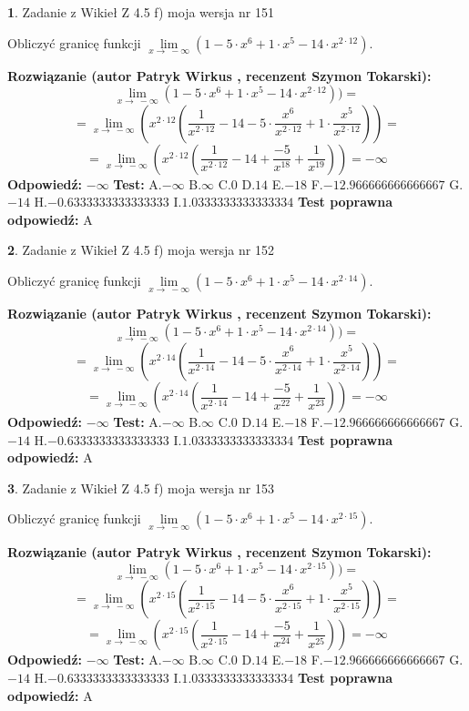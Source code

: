 \documentclass[12pt, a4paper]{article}
\theoremstyle{definition} %
\newtheorem{zad}{}
\newcommand{\zadStart}[1]{\begin{zad}#1\newline}
\newcommand{\zadStop}{\end{zad}}
\newcommand{\rozwStart}[2]{\noindent \textbf{Rozwiązanie (autor #1 , recenzent #2): }\newline}
\newcommand{\rozwStop}{\newline}
\newcommand{\odpStart}{\noindent \textbf{Odpowiedź:}\newline}
\newcommand{\odpStop}{\newline}
\newcommand{\testStart}{\noindent \textbf{Test:}\newline}
\newcommand{\testStop}{\newline}
\newcommand{\kluczStart}{\noindent \textbf{Test poprawna odpowiedź:}\newline}
\newcommand{\kluczStop}{\newline}
\begin{document}
\zadStart{Zadanie z Wikieł Z 4.5 f) moja wersja nr 151}


Obliczyć granicę funkcji  $\lim\limits_{x\to\ -\infty}(1 - 5 \cdot x^{6}+1 \cdot x^{5}- 14 \cdot x^{2\cdot12})$.
\zadStop
\rozwStart{Patryk Wirkus}{Szymon Tokarski}
$$\lim\limits_{x\to\ -\infty}(1 - 5 \cdot x^{6}+1 \cdot x^{5}- 14 \cdot x^{2\cdot12}))=$$
$$=\lim\limits_{x\to\ -\infty}(x^{2\cdot12}(\frac{1}{x^{2\cdot12}}-14 -5 \cdot \frac{x^{6}}{x^{2\cdot12}}+1 \cdot \frac{x^{5}}{x^{2\cdot12}}))=$$
$$=\lim\limits_{x\to\ -\infty}(x^{2\cdot12}(\frac{1}{x^{2\cdot12}}-14 + \frac{-5}{x^{18}}+ \frac{1}{x^{19}}))=-\infty$$
\rozwStop
\odpStart
$-\infty$
\odpStop
\testStart
A.$-\infty$ B.$\infty$ C.$0$ D.$14$ E.$-18$
F.$-12.966666666666667$ G.$-14$
H.$-0.6333333333333333$
I.$1.0333333333333334$
\testStop
\kluczStart
A
\kluczStop



\zadStart{Zadanie z Wikieł Z 4.5 f) moja wersja nr 152}


Obliczyć granicę funkcji  $\lim\limits_{x\to\ -\infty}(1 - 5 \cdot x^{6}+1 \cdot x^{5}- 14 \cdot x^{2\cdot14})$.
\zadStop
\rozwStart{Patryk Wirkus}{Szymon Tokarski}
$$\lim\limits_{x\to\ -\infty}(1 - 5 \cdot x^{6}+1 \cdot x^{5}- 14 \cdot x^{2\cdot14}))=$$
$$=\lim\limits_{x\to\ -\infty}(x^{2\cdot14}(\frac{1}{x^{2\cdot14}}-14 -5 \cdot \frac{x^{6}}{x^{2\cdot14}}+1 \cdot \frac{x^{5}}{x^{2\cdot14}}))=$$
$$=\lim\limits_{x\to\ -\infty}(x^{2\cdot14}(\frac{1}{x^{2\cdot14}}-14 + \frac{-5}{x^{22}}+ \frac{1}{x^{23}}))=-\infty$$
\rozwStop
\odpStart
$-\infty$
\odpStop
\testStart
A.$-\infty$ B.$\infty$ C.$0$ D.$14$ E.$-18$
F.$-12.966666666666667$ G.$-14$
H.$-0.6333333333333333$
I.$1.0333333333333334$
\testStop
\kluczStart
A
\kluczStop



\zadStart{Zadanie z Wikieł Z 4.5 f) moja wersja nr 153}


Obliczyć granicę funkcji  $\lim\limits_{x\to\ -\infty}(1 - 5 \cdot x^{6}+1 \cdot x^{5}- 14 \cdot x^{2\cdot15})$.
\zadStop
\rozwStart{Patryk Wirkus}{Szymon Tokarski}
$$\lim\limits_{x\to\ -\infty}(1 - 5 \cdot x^{6}+1 \cdot x^{5}- 14 \cdot x^{2\cdot15}))=$$
$$=\lim\limits_{x\to\ -\infty}(x^{2\cdot15}(\frac{1}{x^{2\cdot15}}-14 -5 \cdot \frac{x^{6}}{x^{2\cdot15}}+1 \cdot \frac{x^{5}}{x^{2\cdot15}}))=$$
$$=\lim\limits_{x\to\ -\infty}(x^{2\cdot15}(\frac{1}{x^{2\cdot15}}-14 + \frac{-5}{x^{24}}+ \frac{1}{x^{25}}))=-\infty$$
\rozwStop
\odpStart
$-\infty$
\odpStop
\testStart
A.$-\infty$ B.$\infty$ C.$0$ D.$14$ E.$-18$
F.$-12.966666666666667$ G.$-14$
H.$-0.6333333333333333$
I.$1.0333333333333334$
\testStop
\kluczStart
A
\kluczStop
\end{document}
